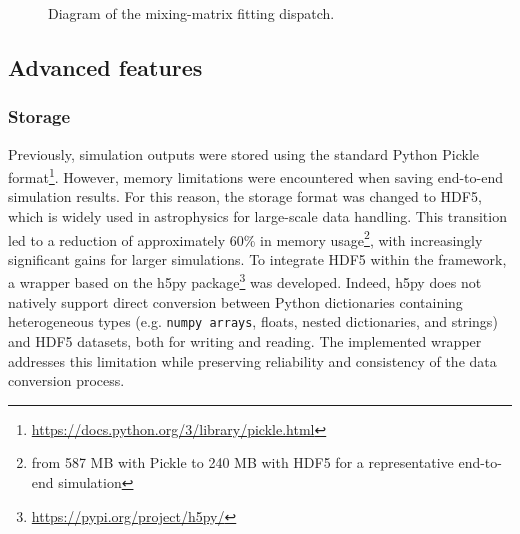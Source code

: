 \documentclass[../../thesis.tex]{subfiles}
\begin{document}
\begin{figure}[htbp]
{%
}
\caption{Diagram of the mixing-matrix fitting dispatch.
}
\label{fig:diagram_mixingmatrix}
\end{figure}

\subsection{Advanced features}

\subsubsection{Storage}

Previously, simulation outputs were stored using the standard Python Pickle format\footnote{\url{https://docs.python.org/3/library/pickle.html}}. However, memory limitations were encountered when saving end-to-end simulation results. For this reason, the storage format was changed to HDF5, which is widely used in astrophysics for large-scale data handling.
This transition led to a reduction of approximately 60\% in memory usage\footnote{from 587 MB with Pickle to 240 MB with HDF5 for a representative end-to-end simulation}, with increasingly significant gains for larger simulations. To integrate HDF5 within the framework, a wrapper based on the h5py package\footnote{\url{https://pypi.org/project/h5py/}} was developed. Indeed, h5py does not natively support direct conversion between Python dictionaries containing heterogeneous types (e.g. \texttt{numpy arrays}, floats, nested dictionaries, and strings) and HDF5 datasets, both for writing and reading. The implemented wrapper addresses this limitation while preserving reliability and consistency of the data conversion process.
\end{document}
